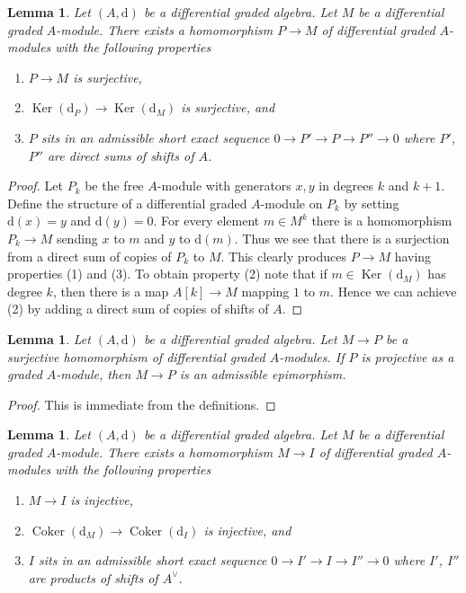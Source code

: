 \documentclass{stacks-project}
\theoremstyle{plain}
\newtheorem{lemma}[subsection]{Lemma}
\theoremstyle{definition}
\theoremstyle{remark}
\numberwithin{equation}{subsection}
\def\Ker{\mathop{\mathrm{Ker}}}
\def\Coker{\mathop{\mathrm{Coker}}}
\begin{document}
\begin{lemma}
\label{lemma-good-quotient}
Let $(A, \text{d})$ be a differential graded algebra.
Let $M$ be a differential graded $A$-module. There exists a homomorphism
$P \to M$ of differential graded $A$-modules with the following
properties
\begin{enumerate}
\item $P \to M$ is surjective,
\item $\Ker(\text{d}_P) \to \Ker(\text{d}_M)$ is surjective, and
\item $P$ sits in an admissible short exact sequence
$0 \to P' \to P \to P'' \to 0$ where $P'$, $P''$ are direct sums
of shifts of $A$.
\end{enumerate}
\end{lemma}

\begin{proof}
Let $P_k$ be the free $A$-module with generators $x, y$ in degrees
$k$ and $k + 1$. Define the structure of a differential graded
$A$-module on $P_k$ by setting $\text{d}(x) = y$ and $\text{d}(y) = 0$.
For every element $m \in M^k$ there is a homomorphism
$P_k \to M$ sending $x$ to $m$ and $y$ to $\text{d}(m)$.
Thus we see that there is a surjection from a direct sum
of copies of $P_k$ to $M$. This clearly produces $P \to M$
having properties (1) and (3). To obtain property (2) note
that if $m \in \Ker(\text{d}_M)$ has degree $k$, then there is a map
$A[k] \to M$ mapping $1$ to $m$. Hence we can achieve (2) by adding
a direct sum of copies of shifts of $A$.
\end{proof}

\begin{lemma}
\label{lemma-target-graded-projective}
Let $(A, \text{d})$ be a differential graded algebra.
Let $M \to P$ be a surjective homomorphism of differential graded
$A$-modules. If $P$ is projective as a graded $A$-module, then
$M \to P$ is an admissible epimorphism.
\end{lemma}

\begin{proof}
This is immediate from the definitions.
\end{proof}

\begin{lemma}
\label{lemma-good-sub}
Let $(A, \text{d})$ be a differential graded algebra.
Let $M$ be a differential graded $A$-module. There exists a homomorphism
$M \to I$ of differential graded $A$-modules with the following
properties
\begin{enumerate}
\item $M \to I$ is injective,
\item $\Coker(\text{d}_M) \to \Coker(\text{d}_I)$ is injective,
and
\item $I$ sits in an admissible short exact sequence
$0 \to I' \to I \to I'' \to 0$ where $I'$, $I''$ are products
of shifts of $A^\vee$.
\end{enumerate}
\end{lemma}
\end{document}
